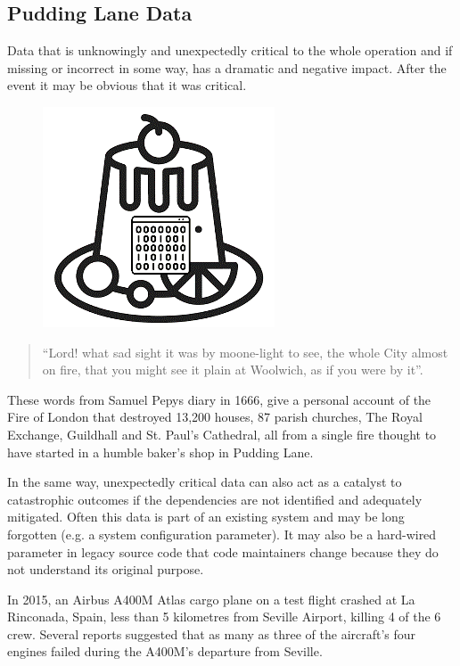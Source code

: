 \subsection{Pudding Lane Data}
 Data that is unknowingly and unexpectedly critical to the whole operation and if missing or incorrect in some way, has a dramatic and negative impact. After the event it may be obvious that it was critical.

\begin{figure}
  \includegraphics{images/cygPudding}
\end{figure}
\begin{quote}
“Lord! what sad sight it was by moone-light to see, the whole City almost on fire,
that you might see it plain at Woolwich, as if you were by it”.
\end{quote}

These words from Samuel Pepys diary in 1666, give a personal account of the Fire of London that
destroyed 13,200 houses, 87 parish churches, The Royal Exchange, Guildhall and St. Paul’s Cathedral,
all from a single fire thought to have started in a humble baker’s shop in Pudding Lane.

In the same way, unexpectedly \gls{critical data} can also act as a catalyst to catastrophic outcomes
if the dependencies are not identified and adequately mitigated.
Often this data is part of an existing system and may be long forgotten
(e.g. a system configuration parameter).
It may also be a hard-wired parameter in legacy source code that code maintainers change because
they do not understand its original purpose.

In 2015, an Airbus A400M Atlas cargo plane on a test flight crashed at La Rinconada, Spain,
less than 5 kilometres from Seville Airport, killing 4 of the 6 crew.
Several reports suggested that as many as three of the aircraft's four engines failed during
the A400M's departure from Seville.

